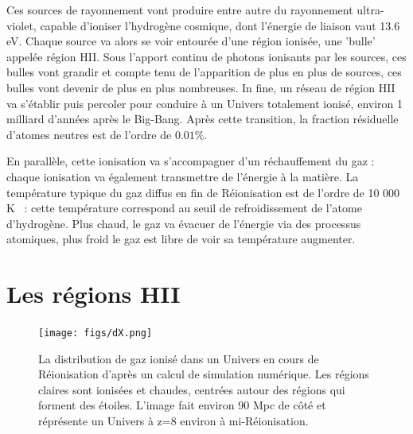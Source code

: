 Ces sources de rayonnement vont produire entre autre du rayonnement ultra-violet, capable d'ioniser l'hydrogène cosmique, dont l'énergie de liaison vaut 13.6 eV. Chaque source va alors se voir entourée d'une région ionisée, une 'bulle' appelée région HII. Sous l'apport continu de photons ionisants par les sources, ces bulles vont grandir et compte tenu de l'apparition de plus en plus de sources, ces bulles vont devenir de plus en plus nombreuses. In fine, un réseau de région HII va s'établir puis percoler pour conduire à un Univers totalement ionisé, environ 1 milliard d'années après le Big-Bang. Après cette transition, la fraction résiduelle d'atomes neutres est de l'ordre de $0.01\%$.

En parallèle, cette ionisation va s'accompagner d'un réchauffement du gaz : chaque ionisation va également transmettre de l'énergie à la matière. La température typique du gaz diffus en fin de Réionisation est de l'ordre de 10 000 K ~: cette température correspond au seuil de refroidissement de l'atome d'hydrogène. Plus chaud, le gaz va évacuer de l'énergie via des processus atomiques, plus froid le gaz est libre de voir sa température augmenter.

\section{Les régions HII}

\begin{figure}[htbp]
	\centering
		\texttt{[image: figs/dX.png]}
		\caption[Le réseau de bulles ionisées de la Réionisation]{La distribution de gaz ionisé dans un Univers en cours de Réionisation d'après un calcul de simulation numérique. Les régions claires sont ionisées et chaudes, centrées autour des régions qui forment des étoiles. L'image fait environ 90 Mpc de côté et réprésente un Univers à z=8 environ à mi-Réionisation.}
	\label{f:dX}
\end{figure} 

